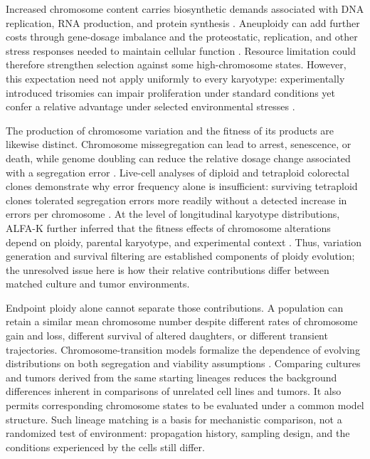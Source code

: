 \documentclass[11pt]{article}
\let\cite\supercite
\begin{document}
Increased chromosome content carries biosynthetic demands associated with DNA replication, RNA production, and protein synthesis \cite{donovan_hyperdiploid_2014,nowicka_interactions_2025,beck_energetics_2025}. Aneuploidy can add further costs through gene-dosage imbalance and the proteostatic, replication, and other stress responses needed to maintain cellular function \cite{santaguida_chromosome_2017,sheltzer_single-chromosome_2017,kuznetsova_chromosomal_2015}. Resource limitation could therefore strengthen selection against some high-chromosome states. However, this expectation need not apply uniformly to every karyotype: experimentally introduced trisomies can impair proliferation under standard conditions yet confer a relative advantage under selected environmental stresses \cite{rutledge_selective_2016}.

The production of chromosome variation and the fitness of its products are likewise distinct. Chromosome missegregation can lead to arrest, senescence, or death, while genome doubling can reduce the relative dosage change associated with a segregation error \cite{thompson_proliferation_2010,silk_chromosome_2013,lopez_interplay_2020}. Live-cell analyses of diploid and tetraploid colorectal clones demonstrate why error frequency alone is insufficient: surviving tetraploid clones tolerated segregation errors more readily without a detected increase in errors per chromosome \cite{dewhurst_tolerance_2014}. At the level of longitudinal karyotype distributions, ALFA-K further inferred that the fitness effects of chromosome alterations depend on ploidy, parental karyotype, and experimental context \cite{beck_alfa-k_2026}. Thus, variation generation and survival filtering are established components of ploidy evolution; the unresolved issue here is how their relative contributions differ between matched culture and tumor environments.

Endpoint ploidy alone cannot separate those contributions. A population can retain a similar mean chromosome number despite different rates of chromosome gain and loss, different survival of altered daughters, or different transient trajectories. Chromosome-transition models formalize the dependence of evolving distributions on both segregation and viability assumptions \cite{elizalde_markov_2018}. Comparing cultures and tumors derived from the same starting lineages reduces the background differences inherent in comparisons of unrelated cell lines and tumors. It also permits corresponding chromosome states to be evaluated under a common model structure. Such lineage matching is a basis for mechanistic comparison, not a randomized test of environment: propagation history, sampling design, and the conditions experienced by the cells still differ.
\end{document}
